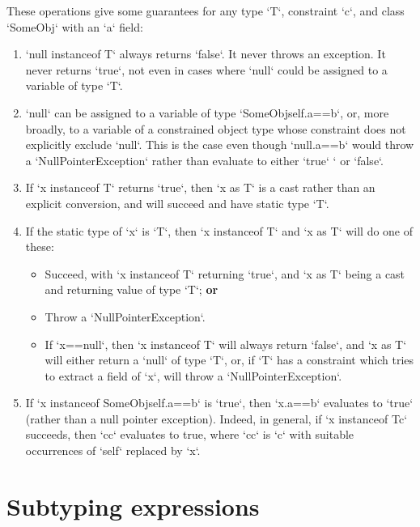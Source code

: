 These operations give some guarantees for any type \xcd`T`, constraint
\xcd`c`, and class 
\xcd`SomeObj` with an \xcd`a` field:
\begin{enumerate}
\item \xcd`null instanceof T` always returns \xcd`false`.  It never throws an
      exception.  It 
      never returns \xcd`true`, not even in cases where \xcd`null` could be
      assigned to a variable of type \xcd`T`.  
\item \xcd`null` can be assigned to a variable of type
      \xcd`SomeObj{self.a==b}`, or, more broadly, to a variable 
      of a constrained object type whose constraint does not explicitly
      exclude \xcd`null`.  This is the case even though \xcd`null.a==b` would
      throw a \xcd`NullPointerException` rather than evaluate to either
      \xcd`true` `
      or \xcd`false`.
\item If \xcd`x instanceof T` returns \xcd`true`, then \xcd`x as T` is a cast
      rather than an explicit conversion, and will succeed and have static
      type \xcd`T`.
\item If the static type of \xcd`x` is \xcd`T`, then \xcd`x instanceof T` and
      \xcd`x as T` will do one of these: 
      \begin{itemize}
      \item Succeed, with \xcd`x instanceof T` returning \xcd`true`, and 
            \xcd`x as T` being a cast and returning value of type \xcd`T`; {\bf or}

      \item Throw a \xcd`NullPointerException`.
      \item If \xcd`x==null`, then \xcd`x instanceof T` will always return
            \xcd`false`, and \xcd`x as T` will either return a \xcd`null` of
            type \xcd`T`, or, if \xcd`T` has a constraint which tries to
            extract a field of \xcd`x`, will throw a \xcd`NullPointerException`.
      \end{itemize}
\item If \xcd`x instanceof SomeObj{self.a==b}` is \xcd`true`, then \xcd`x.a==b`
      evaluates to \xcd`true` (rather than a null pointer exception).  Indeed, 
      in general, if \xcd`x instanceof T{c}` succeeds, then \xcd`cc` evaluates
      to true, where \xcd`cc` is \xcd`c` with suitable occurrences of
      \xcd`self` replaced by \xcd`x`.  
\end{enumerate}



\section{Subtyping expressions}
\label{sect:SubtypingExpression}
\index{\Xcd{<:}}
\index{\Xcd{:>}}



